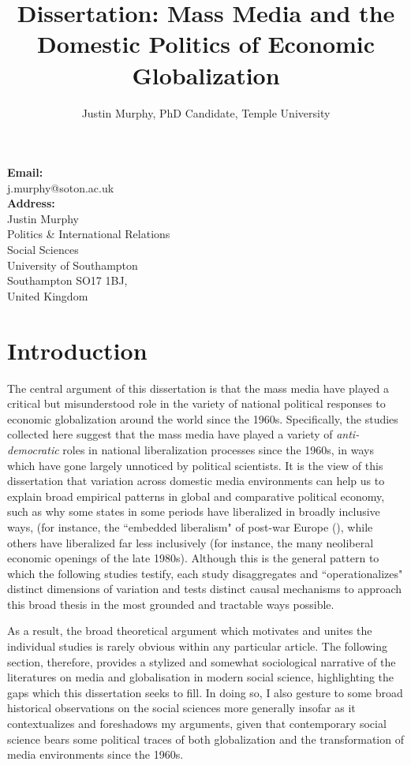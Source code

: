 \documentclass[12pt]{report}
\begin{document}
\title{Dissertation: Mass Media and the Domestic Politics of Economic Globalization}
\author{Justin Murphy, PhD Candidate, Temple University}



\maketitle


\textbf{Email:} \\
j.murphy@soton.ac.uk \\
\textbf{Address:} \\
Justin Murphy \\
Politics \& International Relations \\
Social Sciences \\
University of Southampton \\
Southampton SO17 1BJ, \\
United Kingdom


\chapter{Introduction}

The central argument of this dissertation is that the mass media have
played a critical but misunderstood role in the variety of national
political responses to economic globalization around the world since
the 1960s. Specifically, the studies collected here suggest that the
mass media have played a variety of \emph{anti-democratic} roles in
national liberalization processes since the 1960s, in ways which have
gone largely unnoticed by political scientists. It is the view of
this dissertation that variation across domestic media environments
can help us to explain broad empirical patterns in global and comparative
political economy, such as why some states in some periods have liberalized
in broadly inclusive ways, (for instance, the ``embedded
liberalism" of post-war Europe (\citealt{Ruggie:1982wx}),
while others have liberalized far less inclusively (for instance,
the many neoliberal economic openings of the late 1980s). Although
this is the general pattern to which the following studies testify,
each study disaggregates and ``operationalizes"
distinct dimensions of variation and tests distinct causal mechanisms
to approach this broad thesis in the most grounded and tractable ways
possible.

As a result, the broad theoretical argument which motivates and unites
the individual studies is rarely obvious within any particular article.
The following section, therefore, provides a stylized and somewhat
sociological narrative of the literatures on media and globalisation
in modern social science, highlighting the gaps which this dissertation
seeks to fill. In doing so, I also gesture to some broad historical
observations on the social sciences more generally insofar as it contextualizes
and foreshadows my arguments, given that contemporary social science
bears some political traces of both globalization and the transformation
of media environments since the 1960s.
\end{document}
